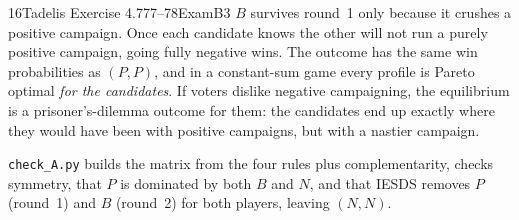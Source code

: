 \begin{exsol}{16}{Tadelis Exercise 4.7}{77--78}{Exam}{B3}
\interp $B$ survives round~1 only because it crushes a positive campaign. Once each candidate
knows the other will not run a purely positive campaign, going fully negative wins. The
outcome has the same win probabilities as $(P,P)$, and in a constant-sum game every profile is
Pareto optimal \emph{for the candidates}. If voters dislike negative campaigning, the
equilibrium is a prisoner's-dilemma outcome for them: the candidates end up exactly where they
would have been with positive campaigns, but with a nastier campaign.

\verify \texttt{check\_A.py} builds the matrix from the four rules plus complementarity, checks
symmetry, that $P$ is dominated by both $B$ and $N$, and that IESDS removes $P$ (round~1) and
$B$ (round~2) for both players, leaving $(N, N)$.

\end{exsol}
